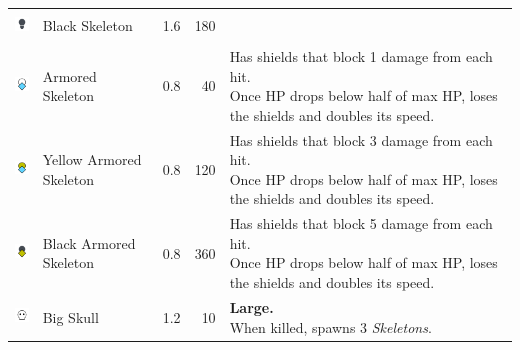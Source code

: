 \begin{table}[H]
\begin{tabular}{m{9mm}m{25mm}D{.}{.}{-1}rm{0.48\textwidth}}
        \includegraphics[height=7mm]{img/Icons/Attackers/Black Skeleton.png}          & \footnotesize{Black Skeleton}          & 1.6                 & 180              &                                                                                                                                                             \\
        \includegraphics[height=7mm]{img/Icons/Attackers/Armored Skeleton.png}        & \footnotesize{Armored Skeleton}        & 0.8                 & 40               & \footnotesize{Has shields that block 1 damage from each hit. \newline Once HP drops below half of max HP, loses the shields and doubles its speed.}         \\
        \includegraphics[height=7mm]{img/Icons/Attackers/Armored Yellow Skeleton.png} & \footnotesize{Yellow Armored Skeleton} & 0.8                 & 120              & \footnotesize{Has shields that block 3 damage from each hit. \newline Once HP drops below half of max HP, loses the shields and doubles its speed.}         \\
        \includegraphics[height=7mm]{img/Icons/Attackers/Armored Black Skeleton.png}  & \footnotesize{Black Armored Skeleton}  & 0.8                 & 360              & \footnotesize{Has shields that block 5 damage from each hit. \newline Once HP drops below half of max HP, loses the shields and doubles its speed.}         \\
        \includegraphics[height=7mm]{img/Icons/Attackers/Big Skull.png}               & \footnotesize{Big Skull}               & 1.2                 & 10               & \footnotesize{\textbf{Large.} \newline When killed, spawns 3 \emph{Skeletons}.}                                                                             \\

\end{tabular}
\end{table}
